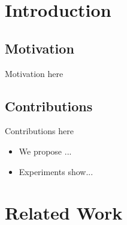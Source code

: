 \documentclass[14pt]{extreport}
\newcommand{\nochapterspacing}[1]{%
  \cleardoublepage %
  \titlespacing*{\chapter}{0pt}{0pt}{5pt}%
  \chapter{#1}%
  \label{ch:#1}%
  \titlespacing*{\chapter}{0pt}{0pt}{5pt}%
}
\begin{document}
\clearpage
\thispagestyle{empty}




\clearpage
\thispagestyle{empty}

\clearpage	

\newpage
{}




\clearpage

\tableofcontents

\listoftables

\listoffigures
\clearpage	


\makeatletter
\setcounter{enumiv}{0}
\makeatother

\chapter{Introduction}\label{ch-Introduction}



\section{Motivation} \label{sec:Challenges}

Motivation here

\section{Contributions} \label{sec:Overview}

Contributions here 
\begin{itemize}
\item We propose ...
\item Experiments show...
\end{itemize}


\nochapterspacing{Related Work}\label{ch:Work}
\end{document}
